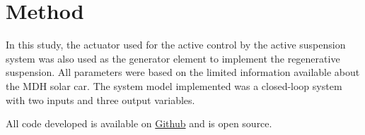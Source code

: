 \section{Method}
In this study, the actuator used for the active control by the active suspension system was also used as the generator element to implement the regenerative suspension\:\cite{liuModelingSimulationEnergyRegenerative2019}. All parameters were based on the limited information available about the MDH solar car\:\cite{mdhsolarteamBillMaterials}\cite{cfw16inchTypeC}. The system model implemented was a closed-loop system with two inputs and three output variables. 

All code developed is available on \href{https://github.com/Mekatronik306}{Github} and is open source.
